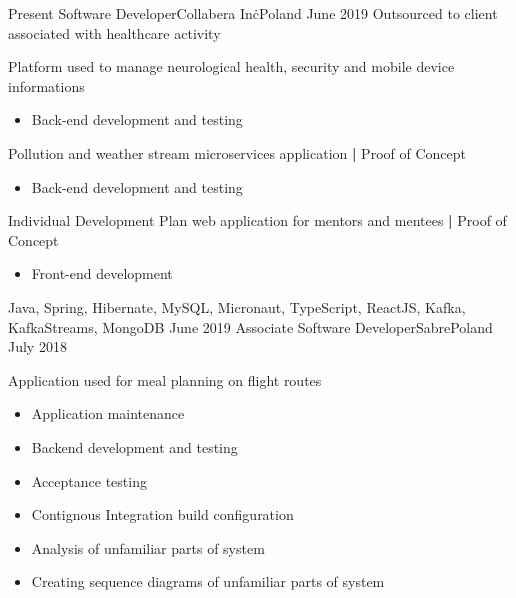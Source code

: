 
\begin{experiences}
  \contractorexperience
    {Present}   {Software Developer}{Collabera Inc\.}{Poland}
    {June 2019} {Outsourced to client associated with healthcare activity}
                {
                        Platform used to manage neurological health, security and mobile device informations
                        \begin{itemize}
                            \item Back-end development and testing      
                        \end{itemize}
                        Pollution and weather stream microservices application \textbf{|} \small{Proof of Concept}\normalsize
                        \begin{itemize}
                            \item Back-end development and testing  
                        \end{itemize}
                        Individual Development Plan web application for mentors and mentees \textbf{|} \small{Proof of Concept}\normalsize
                        \begin{itemize}
                            \item Front-end development
                        \end{itemize}
                    }
                    {Java, Spring, Hibernate, MySQL, Micronaut, TypeScript, ReactJS, Kafka, KafkaStreams, MongoDB}
  \emptySeparator
  \experience
    {June 2019} {Associate Software Developer}{Sabre}{Poland}
    {July 2018}    {
                        Application used for meal planning on flight routes
                        \begin{itemize}
                            \item Application maintenance
                            \item Backend development and testing
                            \item Acceptance testing
                            \item Contignous Integration build configuration
                            \item Analysis of unfamiliar parts of system
                            \item Creating sequence diagrams of unfamiliar parts of system  

\end{itemize}}
\end{experiences}
